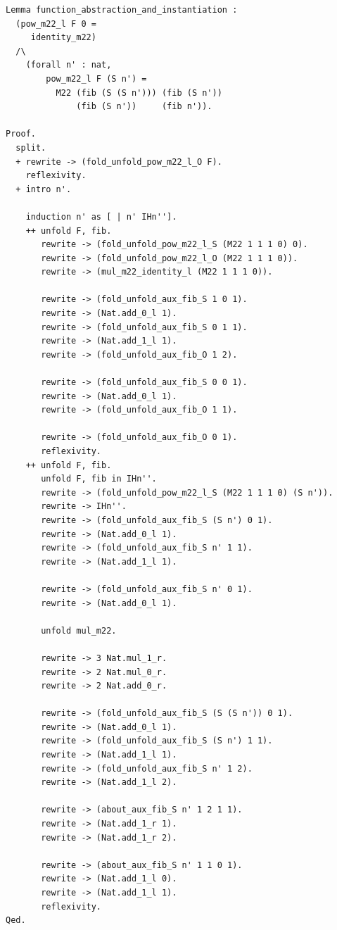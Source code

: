 \documentclass{article}
\begin{document}
\begin{lstlisting}
Lemma function_abstraction_and_instantiation :
  (pow_m22_l F 0 =
     identity_m22)
  /\
    (forall n' : nat,
        pow_m22_l F (S n') =
          M22 (fib (S (S n'))) (fib (S n'))    
              (fib (S n'))     (fib n')).

Proof.
  split.
  + rewrite -> (fold_unfold_pow_m22_l_O F).
    reflexivity.
  + intro n'.

    induction n' as [ | n' IHn''].
    ++ unfold F, fib.
       rewrite -> (fold_unfold_pow_m22_l_S (M22 1 1 1 0) 0).
       rewrite -> (fold_unfold_pow_m22_l_O (M22 1 1 1 0)).
       rewrite -> (mul_m22_identity_l (M22 1 1 1 0)).

       rewrite -> (fold_unfold_aux_fib_S 1 0 1).
       rewrite -> (Nat.add_0_l 1).
       rewrite -> (fold_unfold_aux_fib_S 0 1 1).
       rewrite -> (Nat.add_1_l 1).
       rewrite -> (fold_unfold_aux_fib_O 1 2).

       rewrite -> (fold_unfold_aux_fib_S 0 0 1).
       rewrite -> (Nat.add_0_l 1).
       rewrite -> (fold_unfold_aux_fib_O 1 1).

       rewrite -> (fold_unfold_aux_fib_O 0 1).
       reflexivity.
    ++ unfold F, fib.
       unfold F, fib in IHn''.
       rewrite -> (fold_unfold_pow_m22_l_S (M22 1 1 1 0) (S n')).
       rewrite -> IHn''.
       rewrite -> (fold_unfold_aux_fib_S (S n') 0 1).
       rewrite -> (Nat.add_0_l 1).
       rewrite -> (fold_unfold_aux_fib_S n' 1 1).
       rewrite -> (Nat.add_1_l 1).

       rewrite -> (fold_unfold_aux_fib_S n' 0 1).
       rewrite -> (Nat.add_0_l 1).

       unfold mul_m22.

       rewrite -> 3 Nat.mul_1_r.
       rewrite -> 2 Nat.mul_0_r.
       rewrite -> 2 Nat.add_0_r.
       
       rewrite -> (fold_unfold_aux_fib_S (S (S n')) 0 1).
       rewrite -> (Nat.add_0_l 1).
       rewrite -> (fold_unfold_aux_fib_S (S n') 1 1).
       rewrite -> (Nat.add_1_l 1).
       rewrite -> (fold_unfold_aux_fib_S n' 1 2).
       rewrite -> (Nat.add_1_l 2).
       
       rewrite -> (about_aux_fib_S n' 1 2 1 1).
       rewrite -> (Nat.add_1_r 1).
       rewrite -> (Nat.add_1_r 2).

       rewrite -> (about_aux_fib_S n' 1 1 0 1).
       rewrite -> (Nat.add_1_l 0).
       rewrite -> (Nat.add_1_l 1).
       reflexivity.
Qed.
\end{lstlisting}
\end{document}
